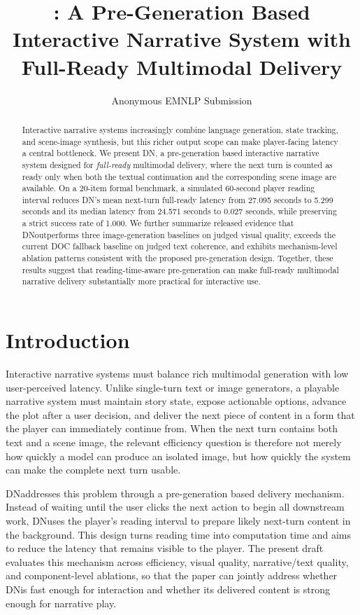 ﻿\documentclass[11pt]{article}
\title{\dn: A Pre-Generation Based Interactive Narrative System with Full-Ready Multimodal Delivery}
\author{Anonymous EMNLP Submission}
\newcommand{\dn}{\textsc{DN}}
\begin{document}
\maketitle

\begin{abstract}
Interactive narrative systems increasingly combine language generation, state tracking, and scene-image synthesis, but this richer output scope can make player-facing latency a central bottleneck. We present \dn, a pre-generation based interactive narrative system designed for \emph{full-ready} multimodal delivery, where the next turn is counted as ready only when both the textual continuation and the corresponding scene image are available. On a 20-item formal benchmark, a simulated 60-second player reading interval reduces \dn's mean next-turn full-ready latency from 27.095 seconds to 5.299 seconds and its median latency from 24.571 seconds to 0.027 seconds, while preserving a strict success rate of 1.000. We further summarize released evidence that \dn outperforms three image-generation baselines on judged visual quality, exceeds the current DOC fallback baseline on judged text coherence, and exhibits mechanism-level ablation patterns consistent with the proposed pre-generation design. Together, these results suggest that reading-time-aware pre-generation can make full-ready multimodal narrative delivery substantially more practical for interactive use.
\end{abstract}

\section{Introduction}
Interactive narrative systems must balance rich multimodal generation with low user-perceived latency. Unlike single-turn text or image generators, a playable narrative system must maintain story state, expose actionable options, advance the plot after a user decision, and deliver the next piece of content in a form that the player can immediately continue from. When the next turn contains both text and a scene image, the relevant efficiency question is therefore not merely how quickly a model can produce an isolated image, but how quickly the system can make the complete next turn usable.

\dn addresses this problem through a pre-generation based delivery mechanism. Instead of waiting until the user clicks the next action to begin all downstream work, \dn uses the player's reading interval to prepare likely next-turn content in the background. This design turns reading time into computation time and aims to reduce the latency that remains visible to the player. The present draft evaluates this mechanism across efficiency, visual quality, narrative/text quality, and component-level ablations, so that the paper can jointly address whether \dn is fast enough for interaction and whether its delivered content is strong enough for narrative play.
\end{document}
